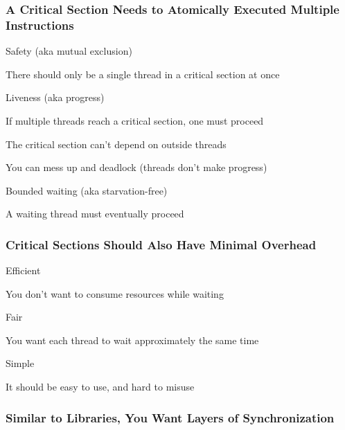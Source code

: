   \begin{frame}
    \frametitle{A Critical Section Needs to Atomically Executed Multiple
                Instructions}

    Safety (aka mutual exclusion)

    \hspace{2em} There should only be a single thread in a critical section at
    once

    \vspace{2em}

    Liveness (aka progress)

    \hspace{2em} If multiple threads reach a critical section, one must proceed

    \hspace{2em} The critical section can't depend on outside threads

    \hspace{4em} You can mess up and deadlock (threads don't make progress)

    \vspace{2em}

    Bounded waiting (aka starvation-free)

    \hspace{2em} A waiting thread must eventually proceed
  \end{frame}

  \begin{frame}
    \frametitle{Critical Sections Should Also Have Minimal Overhead}

    Efficient

    \hspace{2em} You don't want to consume resources while waiting

    \vspace{2em}

    Fair

    \hspace{2em} You want each thread to wait approximately the same time

    \vspace{2em}

    Simple

    \hspace{2em} It should be easy to use, and hard to misuse
  \end{frame}

  \begin{frame}
    \frametitle{Similar to Libraries, You Want Layers of Synchronization}

    \centering
  \end{frame}

